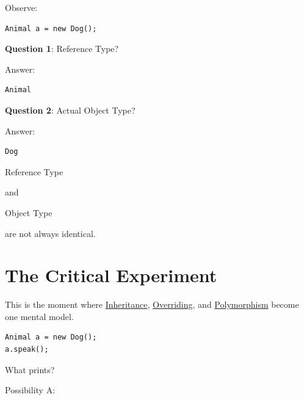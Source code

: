 \documentclass[11pt,a4paper]{book}
\begin{document}
Observe:

\begin{verbatim}
Animal a = new Dog();
\end{verbatim}


\textbf{Question 1}: Reference Type?

Answer:

\begin{verbatim}
Animal
\end{verbatim}

\textbf{Question 2}: Actual Object Type?

Answer:

\begin{verbatim}
Dog
\end{verbatim}


\begin{rosettarule}

\textcolor{RosettaRoyalPurple}{Reference Type}

and

\textcolor{RosettaDeepGreen}{Object Type}

are not always identical.

\end{rosettarule}


\section{The Critical Experiment}\label{sec:dynamic_dispatch_experiment}

This is the moment where \hyperref[chap:inheritance]{Inheritance}, \hyperref[sec:method_overriding]{Overriding}, and \hyperref[chap:polymorphism]{Polymorphism} become one mental model.

\begin{verbatim}
Animal a = new Dog();
a.speak();
\end{verbatim}


What prints?


Possibility A:\@
\end{document}
